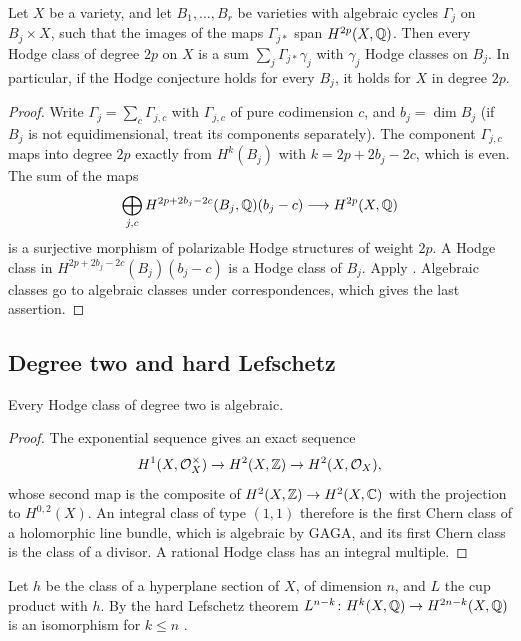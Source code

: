 \begin{lemma}\label{lem:dominated}
Let $X$ be a variety, and let $B_{1},\dots,B_{r}$ be varieties with
algebraic cycles $\Gamma_{j}$ on $B_{j}\times X$, such that the images of
the maps $\Gamma_{j*}$ span $H^{2p}(X,\mathbb{Q})$. Then every Hodge class of degree
$2p$ on $X$ is a sum $\sum_{j}\Gamma_{j*}\gamma_{j}$ with $\gamma_{j}$ Hodge
classes on $B_{j}$. In particular, if the Hodge conjecture holds for every
$B_{j}$, it holds for $X$ in degree $2p$.
\end{lemma}

\begin{proof}
Write $\Gamma_{j}=\sum_{c}\Gamma_{j,c}$ with $\Gamma_{j,c}$ of pure
codimension $c$, and $b_{j}=\dim B_{j}$ (if $B_{j}$ is not equidimensional,
treat its components separately). The component $\Gamma_{j,c}$ maps into
degree $2p$ exactly from $H^{k}(B_{j})$ with $k=2p+2b_{j}-2c$, which is
even. The sum of the maps
\[
  \bigoplus_{j,c}H^{2p+2b_{j}-2c}(B_{j},\mathbb{Q})(b_{j}-c)\longrightarrow
  H^{2p}(X,\mathbb{Q})
\]
is a surjective morphism of polarizable Hodge structures of weight $2p$.
A Hodge class in $H^{2p+2b_{j}-2c}(B_{j})(b_{j}-c)$ is a Hodge class of
$B_{j}$. Apply . Algebraic classes go to algebraic classes
under correspondences, which gives the last assertion.
\end{proof}

\subsection{Degree two and hard Lefschetz}

\begin{theorem}\label{thm:lef11}
Every Hodge class of degree two is algebraic.
\end{theorem}

\begin{proof}
The exponential sequence gives an exact sequence
\[
  H^{1}(X,\mathcal{O}_{X}^{\times})\to H^{2}(X,\mathbb{Z})\to H^{2}(X,\mathcal{O}_{X}),
\]
whose second
map is the composite of $H^{2}(X,\mathbb{Z})\to H^{2}(X,\mathbb{C})$ with the projection
to $H^{0,2}(X)$. An integral class of type $(1,1)$ therefore is the first
Chern class of a holomorphic line bundle, which is algebraic by GAGA, and
its first Chern class is the class of a divisor. A rational Hodge class has
an integral multiple.
\end{proof}

Let $h$ be the class of a hyperplane section of $X$, of dimension $n$, and
$L$ the cup product with $h$. By the hard Lefschetz theorem
$L^{n-k}\colon H^{k}(X,\mathbb{Q})\to H^{2n-k}(X,\mathbb{Q})$ is an isomorphism for
$k\le n$ \cite[Theorem~6.25]{Voi02b}.

